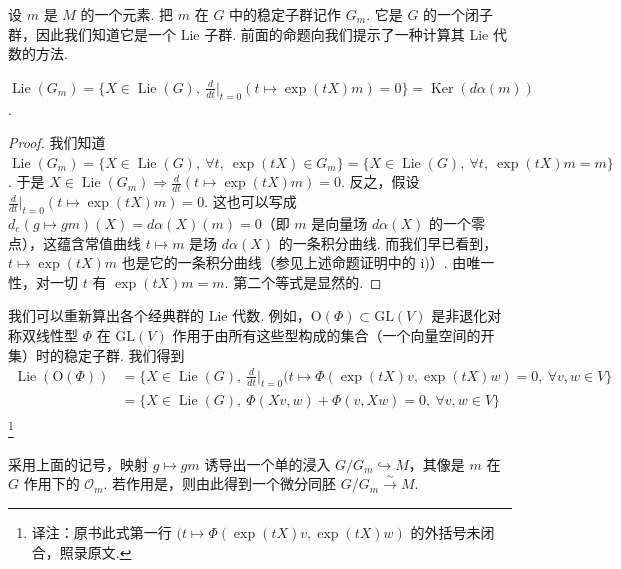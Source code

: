 \begin{numpara}\label{np:lie-1-8-3}
设 $m$ 是 $M$ 的一个元素. 把 $m$ 在 $G$ 中的稳定子群记作 $G_{m}$. 它是 $G$ 的一个闭子群，因此我们知道它是一个 Lie 子群. 前面的命题向我们提示了一种计算其 Lie 代数的方法.
\end{numpara}

\begin{corollary*}
$\operatorname{Lie}(G_{m})=\{X\in\operatorname{Lie}(G),\ \frac{d}{dt}\bigr|_{t=0}(t\mapsto\exp(tX)m)=0\}=\operatorname{Ker}(d\alpha(m))$.
\end{corollary*}

\begin{proof}
我们知道 $\operatorname{Lie}(G_{m})=\{X\in\operatorname{Lie}(G),\ \forall t,\ \exp(tX)\in G_{m}\}=\{X\in\operatorname{Lie}(G),\ \forall t,\ \exp(tX)m=m\}$. 于是 $X\in\operatorname{Lie}(G_{m})\Rightarrow\frac{d}{dt}(t\mapsto\exp(tX)m)=0$.
反之，假设 $\frac{d}{dt}\bigr|_{t=0}(t\mapsto\exp(tX)m)=0$. 这也可以写成 $d_{e}(g\mapsto gm)(X)=d\alpha(X)(m)=0$（即 $m$ 是向量场 $d\alpha(X)$ 的一个零点），这蕴含常值曲线 $t\mapsto m$ 是场 $d\alpha(X)$ 的一条积分曲线.
而我们早已看到，$t\mapsto\exp(tX)m$ 也是它的一条积分曲线（参见上述命题证明中的 i)）. 由唯一性，对一切 $t$ 有 $\exp(tX)m=m$.
第二个等式是显然的.
\end{proof}

\begin{example*}
我们可以重新算出各个经典群的 Lie 代数. 例如，$\mathrm{O}(\Phi)\subset\mathrm{GL}(V)$ 是非退化对称双线性型 $\Phi$ 在 $\mathrm{GL}(V)$ 作用于由所有这些型构成的集合（一个向量空间的开集）时的稳定子群. 我们得到
\begin{align*}
\operatorname{Lie}(\mathrm{O}(\Phi)) &= \{X\in\operatorname{Lie}(G),\ \frac{d}{dt}\bigr|_{t=0}(t\mapsto\Phi(\exp(tX)v,\exp(tX)w)=0,\ \forall v,w\in V\}\\
&= \{X\in\operatorname{Lie}(G),\ \Phi(Xv,w)+\Phi(v,Xw)=0,\ \forall v,w\in V\}\\
\end{align*}
\footnote{译注：原书此式第一行 $(t\mapsto\Phi(\exp(tX)v,\exp(tX)w)$ 的外括号未闭合，照录原文.}
\end{example*}

\begin{corollary*}
采用上面的记号，映射 $g\mapsto gm$ 诱导出一个单的浸入 $G/G_{m}\hookrightarrow M$，其像是 $m$ 在 $G$ 作用下的 $\mathcal O_{m}$. 若作用是，则由此得到一个微分同胚 $G/G_{m}\xrightarrow{\ \sim\ }M$.
\end{corollary*}

